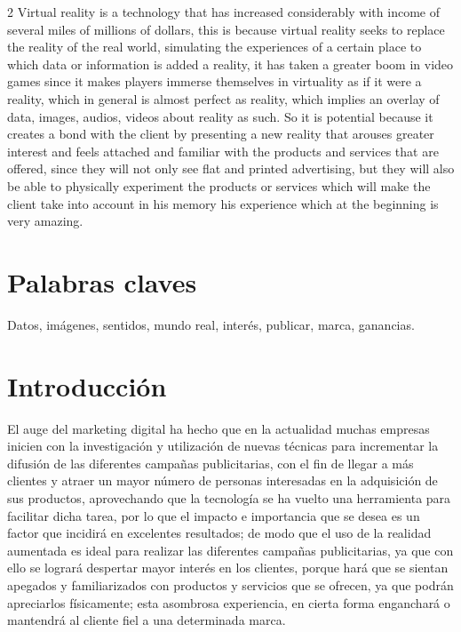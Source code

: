 \documentclass[12pt,spanish,Letterpaper,openany]{book}
\begin{document}
\begin {multicols}{2}
Virtual reality is a technology that has increased considerably with income of several miles of millions of dollars, this is because virtual reality seeks to replace the reality of the real world, simulating the experiences of a certain place to which data or information is added a reality, it has taken a greater boom in video games since it makes players immerse themselves in virtuality as if it were a reality, which in general is almost perfect as reality, which implies an overlay of data, images, audios, videos about reality as such. So it is potential because it creates a bond with the client by presenting a new reality that arouses greater interest and feels attached and familiar with the products and services that are offered, since they will not only see flat and printed advertising, but they will also be able to physically experiment the products or services which will make the client take into account in his memory his experience which at the beginning is very amazing.

\hypertarget{palabras-claves-4}{%
\section{Palabras claves}\label{palabras-claves-4}}

Datos, imágenes, sentidos, mundo real, interés, publicar, marca, ganancias.

\hypertarget{introducciuxf3n-4}{%
\section{Introducción}\label{introducciuxf3n-4}}

El auge del marketing digital ha hecho que en la actualidad muchas empresas inicien con la investigación y utilización de nuevas técnicas para incrementar la difusión de las diferentes campañas publicitarias, con el fin de llegar a más clientes y atraer un mayor número de personas interesadas en la adquisición de sus productos, aprovechando que la tecnología se ha vuelto una herramienta para facilitar dicha tarea, por lo que el impacto e importancia que se desea es un factor que incidirá en excelentes resultados; de modo que el uso de la realidad aumentada es ideal para realizar las diferentes campañas publicitarias, ya que con ello se logrará despertar mayor interés en los clientes, porque hará que se sientan apegados y familiarizados con productos y servicios que se ofrecen, ya que podrán apreciarlos físicamente; esta asombrosa experiencia, en cierta forma enganchará o mantendrá al cliente fiel a una determinada marca.


\end{multicols}
\end{document}
